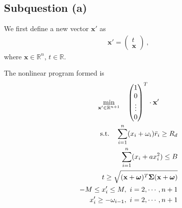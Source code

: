 \documentclass[12pt]{ftec2101}
\newcommand{\vect}[1]{\mathbf{#1}}
\begin{document}
\subsection{Subquestion (a)}
We first define a new vector $\vect{x'}$ as
\begin{align*}
    \vect{x'} = 
    \begin{pmatrix}
        t \\
        \vect{x}
    \end{pmatrix}\ , 
\end{align*}
where $\vect{x} \in \mathbb{R}^n$, $t \in \mathbb{R}$.

\noindent
The nonlinear program formed is 
\begin{gather}
    \min_{\vect{x'} \in \mathbb{R}^{n+1}} \quad
    \begin{pmatrix}
        1 \\
        0 \\
        \vdots \\
        0
    \end{pmatrix}^T
    \cdot \vect{x'}\\
\begin{aligned}
    \textup{s.t.} \quad \sum_{i=1}^{n} (x_i + \omega_i)\bar{r}_i \geq R_d \\
                        \sum_{i=1}^{n} (x_i + a x_i^2) \leq B \\
                        t \geq \sqrt{(\vect{x}+\boldsymbol{\omega})^T \boldsymbol{\Sigma} (\vect{x}+\boldsymbol{\omega})} \\
                        -M \leq x'_i \leq M,\ i=2,\cdots,n+1 \\
                        x'_i \geq - \omega_{i - 1},\ i=2,\cdots,n+1
\end{aligned}
\label{nonlinear:constraint}
\end{gather}
\end{document}
